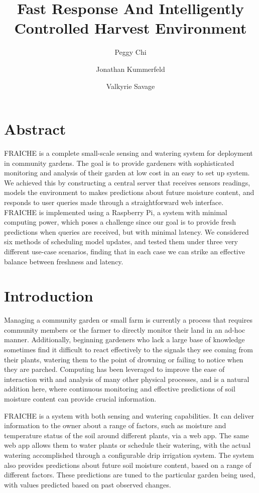 \documentclass[a4paper]{acm_proc_article-sp}
\begin{document}
\title{Fast Response And Intelligently Controlled Harvest Environment}
\author{Peggy Chi \and Jonathan Kummerfeld \and Valkyrie Savage}
\maketitle

\setcounter{page}{1}

\section{Abstract}

FRAICHE is a complete small-scale sensing and watering system for deployment in community gardens.  The goal is to provide gardeners with sophisticated monitoring and analysis of their garden at low cost in an easy to set up system.  We achieved this by constructing a central server that receives sensors readings, models the environment to makes predictions about future moisture content, and responds to user queries made through a straightforward web interface.  FRAICHE is implemented using a Raspberry Pi, a system with minimal computing power, which poses a challenge since our goal is to provide fresh predictions when queries are received, but with minimal latency.  We considered six methods of scheduling model updates, and tested them under three very different use-case scenarios, finding that in each case we can strike an effective balance between freshness and latency.

\section{Introduction}

Managing a community garden or small farm is currently a process that requires community members or the farmer to directly monitor their land in an ad-hoc manner.  Additionally, beginning gardeners who lack a large base of knowledge sometimes find it difficult to react effectively to the signals they see coming from their plants, watering them to the point of drowning or failing to notice when they are parched.  Computing has been leveraged to improve the ease of interaction with and analysis of many other physical processes, and is a natural addition here, where continuous monitoring and effective predictions of soil moisture content can provide crucial information.

FRAICHE is a system with both sensing and watering capabilities. It can deliver information to the owner about a range of factors, such as moisture and temperature status of the soil around different plants, via a web app. The same web app allows them to water plants or schedule their watering, with the actual watering accomplished through a configurable drip irrigation system. The system also provides predictions about future soil moisture content, based on a range of different factors. These predictions are tuned to the particular garden being used, with values predicted based on past observed changes.
\end{document}
